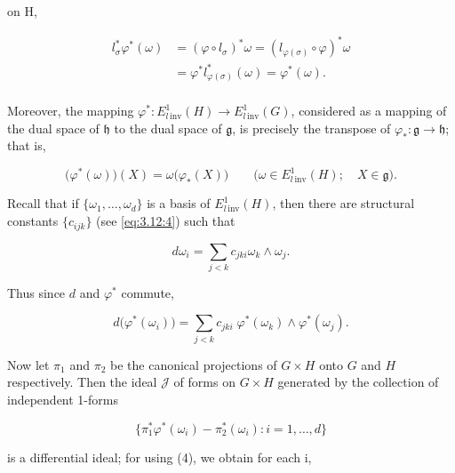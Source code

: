 on H,

\begin{equation}
\tag{1}\label{eq:3.15:1}
\begin{aligned}{l_{\sigma}^{*}\varphi^{*}(\omega)}&{{}=(\varphi\circ l_{\sigma})^{*}\omega=(l_{\varphi(\sigma)}\circ\varphi)^{*}\omega}\\ {}&{{}=\varphi^{*}l_{\varphi(\sigma)}^{*}(\omega)=\varphi^{*}(\omega).}\\ \end{aligned}
\end{equation}

Moreover, the mapping $\varphi^{*}\colon E_{l\,\mathrm{inv}}^{1}(H)\to E_{l\,\mathrm{inv}}^{1}(G)$, considered as a mapping of the dual space of $\mathfrak{h}$ to the dual space of $\mathfrak{g}$, is precisely the transpose of $\varphi_{*}\colon\mathfrak{g}\to\mathfrak{h}$; that is,

\begin{equation}
\tag{2}\label{eq:3.15:2}
\big(\varphi^{*}(\omega)\big)(X)=\omega\big(\varphi_{*}(X)\big)\qquad\big(\omega\in E_{l\,\mathrm{inv}}^{1}(H);\quad X\in\mathfrak{g}\big).
\end{equation}

Recall that if $\{\omega_1, \ldots, \omega_d\}$ is a basis of $E_{l\,\mathrm{inv}}^{1}(H)$, then there are structural constants $\{c_{ijk}\}$ (see \eqref{eq:3.12:4}) such that

\begin{equation}
\tag{3}\label{eq:3.15:3}
d\omega_{i}=\sum_{j<k}c_{j k i}\omega_{k}\wedge\omega_{j}.
\end{equation}

Thus since $d$ and $\varphi^{*}$ commute,

\begin{equation}
\tag{4}\label{eq:3.15:4}
d\big(\varphi^{*}(\omega_{i})\big)=\sum_{j<k}c_{j k i}\;\varphi^{*}(\omega_{k})\wedge\varphi^{*}(\omega_{j}).
\end{equation}

Now let $\pi_{1}$ and $\pi_{2}$ be the canonical projections of $G \times H$ onto $G$ and $H$ respectively. Then the ideal $\mathcal{J}$ of forms on $G \times H$ generated by the collection of independent 1-forms

\begin{equation}
\tag{5}\label{eq:3.15:5}
\{\pi_{1}^{*}\varphi^{*}(\omega_{i})-\pi_{2}^{*}(\omega_{i})\colon i=1,\ldots,d\}
\end{equation}

is a differential ideal; for using (4), we obtain for each i,

